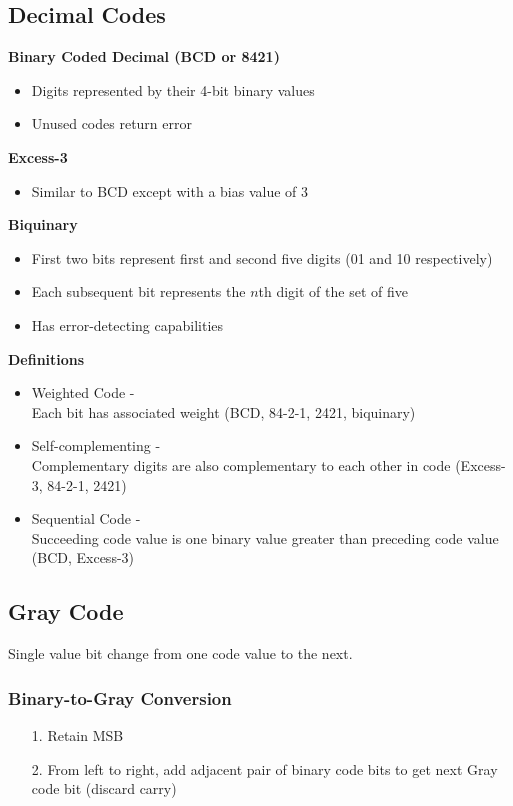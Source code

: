 \documentclass[10pt, twocolumn]{article}
\begin{document}
\subsection{Decimal Codes}
{\bf Binary Coded Decimal (BCD or 8421)}
\begin{itemize}
\item Digits represented by their 4-bit binary values
\item Unused codes return error
\end{itemize}
{\bf Excess-3}
\begin{itemize}
\item Similar to BCD except with a bias value of 3
\end{itemize}
{\bf Biquinary}
\begin{itemize}
\item First two bits represent first and second five digits (01 and 10 respectively)
\item Each subsequent bit represents the $n$th digit of the set of five
\item Has error-detecting capabilities
\end{itemize}
{\bf Definitions}
\begin{itemize}
\item Weighted Code - \\
Each bit has associated weight (BCD, 84-2-1, 2421, biquinary)
\item Self-complementing - \\
Complementary digits are also complementary to each other in code (Excess-3, 84-2-1, 2421)
\item Sequential Code - \\
Succeeding code value is one binary value greater than preceding code value (BCD, Excess-3)
\end{itemize}

\subsection{Gray Code}
Single value bit change from one code value to the next.
\subsubsection{Binary-to-Gray Conversion}
\begin{enumerate}
\item[1.]{Retain MSB}
\item[2.]{From left to right, add adjacent pair of binary code bits to get next Gray code bit (discard carry)}
\end{enumerate}
\end{document}
